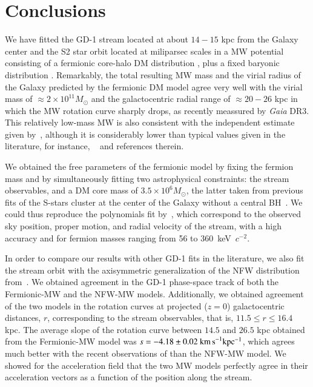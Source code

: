 \documentclass[twocolumn]{aa}
\begin{document}
\section{Conclusions}
\label{sec:conclusions}
We have fitted the GD-1 stream located at about $14-15$ kpc from the Galaxy center and the S2 star orbit located at miliparsec scales in a MW potential consisting of a fermionic core-halo DM distribution
\citep{arguelles_novel_2018,2020A&A...641A..34B,2021MNRAS.505L..64B,2022MNRAS.511L..35A}, plus a fixed baryonic distribution \citep{2017A&A...598A..66P}. Remarkably, the total resulting MW mass and the virial radius of the Galaxy predicted by the fermionic DM model agree very well with the virial mass of $\approx 2\times 10^{11} M_\odot$ and the galactocentric radial range of $\approx 20-26$ kpc in which the MW rotation curve sharply drops, as recently meassured by {\it Gaia} DR3. This relatively low-mass MW is also consistent with the independent estimate given by~\cite{2014MNRAS.445.3788G}, although it is considerably lower than typical values given in the literature, for instance, ~\cite{2010MNRAS.406..264W} and references therein.

We obtained the free parameters of the fermionic model by fixing the fermion mass and by simultaneously fitting two astrophysical constraints: the stream observables, and a
DM core mass of $3.5\times10^6M_\odot$, the latter taken from previous fits of the S-stars cluster at
the center of the Galaxy without a central BH~\citep{2020A&A...641A..34B,2021MNRAS.505L..64B}. We could thus reproduce the polynomials fit by~\citet{Ibata_2020}, which correspond to the observed sky position, proper motion, and radial velocity of the stream, with a high accuracy and for fermion masses ranging from 56 to 360~keV~$c^{-2}$.

In order to compare our results with other GD-1 fits in the literature, we also fit the stream orbit with the  axisymmetric generalization of the NFW distribution from~\citet{2019MNRAS.486.2995M}. We obtained agreement in the GD-1 phase-space track of
both the Fermionic-MW and the NFW-MW models. Additionally, we obtained agreement of the two models in the rotation curves at projected ($z=0$) galactocentric distances, $r$, corresponding to the stream observables, that is, $11.5\leq r \leq 16.4$ kpc. The average slope of the rotation curve between $14.5$ and $26.5$ kpc obtained from the Fermionic-MW model was $s=-4.18 \pm 0.02~\rm{km\, s}^{-1} kpc^{-1}$, which agrees much better with the recent observations of \cite{Jiao2023} than the NFW-MW model. We showed for the acceleration field that the two MW models perfectly agree in their acceleration vectors as a function of the position along the stream.
\end{document}
